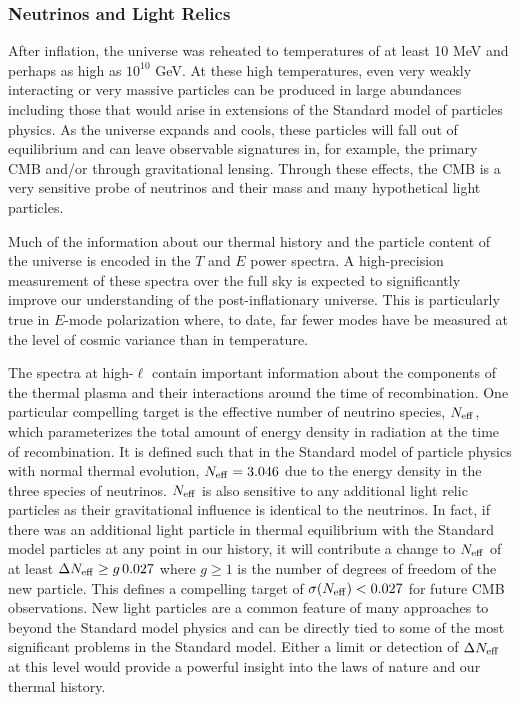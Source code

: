 \vspace{-0.15in}

\subsubsection{Neutrinos and Light Relics}

\vspace{-0.05in}

After inflation, the universe was reheated to temperatures of at least 10 MeV and perhaps as high as $10^{10}$ GeV.  At these high temperatures, even very weakly interacting or very massive particles can be produced in large abundances including those that would arise in extensions of the Standard model of particles physics.  As the universe expands and cools, these particles will fall out of equilibrium and can leave observable signatures in, for example, the primary CMB and/or through gravitational lensing.  Through these effects, the CMB is a very sensitive probe of neutrinos and their mass and many hypothetical light particles.  

Much of the information about our thermal history and the particle content of the universe is encoded in the $T$ and $E$ power spectra.  
A high-precision measurement of these spectra over the full sky is expected to significantly improve our understanding of the post-inflationary 
universe.  This is particularly true in $E$-mode polarization where, to date, far fewer modes have be measured at the level of cosmic variance than in temperature.

The spectra at high-$\ell$ contain important information about the components of the thermal plasma and their interactions around the time of recombination.  One particular compelling target is the effective number of neutrino species, ${N_{\rm eff}}$, which parameterizes the total amount of energy density in radiation at the time of recombination.  It is defined such that in the Standard model of particle physics with normal thermal evolution, ${N_{\rm eff}} = 3.046$ due to the energy density in the three species of neutrinos.  ${N_{\rm eff}}$ is also sensitive to any additional light relic particles as their gravitational influence is identical to the neutrinos.  In fact, if there was an additional light particle in thermal equilibrium with the Standard model particles at any point in our history, it will contribute a change to ${N_{\rm eff}}$ of at least $\Delta {N_{\rm eff}} \geq g \, 0.027$ where $g \geq 1$ is the number of degrees of freedom of the new particle.  This defines a compelling target of $\sigma({N_{\rm eff}}) < 0.027$ for future CMB observations.  New light particles are a common feature of many approaches to beyond the Standard model physics and can be directly tied to some of the most significant problems in the Standard model.  Either a limit or detection of $\Delta {N_{\rm eff}}$ at this level would provide a powerful insight into the laws of nature and our thermal history. 

